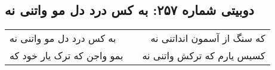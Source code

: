 \begin{center}
\section*{دوبیتی شماره ۲۵۷: به کس درد دل مو واتنی نه}
\label{sec:257}
\begin{longtable}{l p{0.5cm} r}
به کس درد دل مو واتنی نه
&&
که سنگ از آسمون انداتنی نه
\\
بمو واجن که ترک یار خود که
&&
کسیس یارم که ترکش واتنی نه
\\
\end{longtable}
\end{center}

